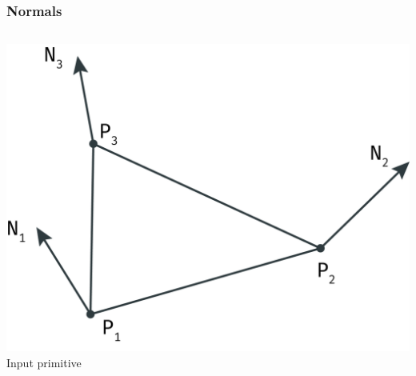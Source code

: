 	\begin{frame}\frametitle{Normals}
		\begin{columns}
			\begin{column}{0.6\textwidth}
				\begin{center}
					\includegraphics[width=\textwidth]{img/1_single/inputPrimitive.png}
					\small{Input primitive}
				\end{center}
			\end{column}
		\end{columns}
	\end{frame}


